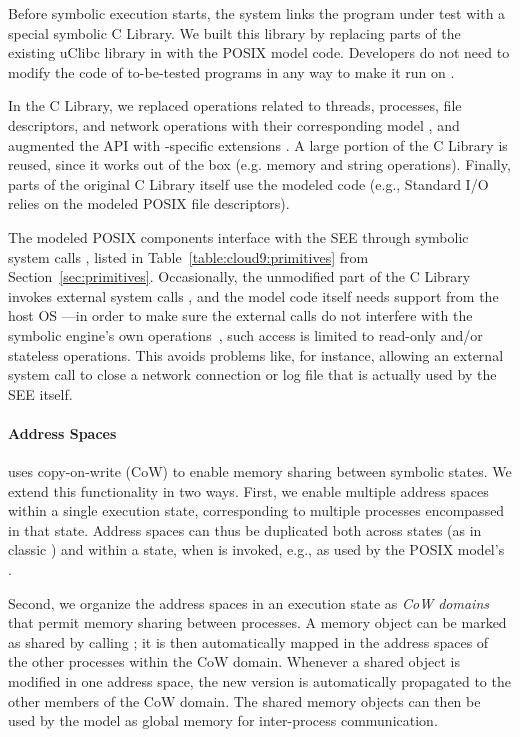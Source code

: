 Before symbolic execution starts, the \cnine system links the program under test with a special symbolic C Library.
%
We built this library by replacing parts of the existing uClibc library in \klee with the POSIX model code.  Developers do not need to modify the code of to-be-tested programs in any way to make it run on \cnine.  

In the C Library, we replaced operations related to threads, processes, file descriptors, and network operations with their corresponding model \cI, and augmented the API with \cnine-specific extensions \cII.
%
A large portion of the C Library is reused, since it works out of the box \cIII (e.g. memory and string operations).  Finally, parts of the original C Library itself use  the modeled code \cIV (e.g., Standard I/O  relies on the modeled POSIX file descriptors).

The modeled POSIX components interface with the SEE through symbolic system calls \cV, listed in Table~\ref{table:cloud9:primitives} from Section~\ref{sec:primitives}.
%
Occasionally, the unmodified part of the C Library invokes external system calls \cVI, and the model code itself needs support from the host OS \cVII---in order to make sure the external calls do not interfere with the symbolic engine's own operations~\cVIII, such access is limited to read-only and/or stateless operations.  This avoids problems like, for instance, allowing an external  system call to close a network connection or log file that is actually used by the SEE itself.

\paragraph{Address Spaces}

\klee uses copy-on-write (CoW) to enable memory sharing between symbolic states.
%
We extend this functionality in two ways.  First, we enable multiple address spaces within a single execution state, corresponding to multiple processes encompassed in that state. Address spaces can thus be duplicated both across states (as in classic \klee) and within a state, when  is invoked, e.g., as used by the POSIX model's .

Second, we organize the address spaces in an execution state as \emph{CoW domains} that permit memory sharing between processes.
%
A memory object can be marked as shared by calling ; it is then automatically mapped in the address spaces of the other processes within the CoW domain.  Whenever a shared object is modified in one address space, the new version is automatically propagated to the other members of the CoW domain.  The shared memory objects can then be used by the model as global memory for inter-process communication.

